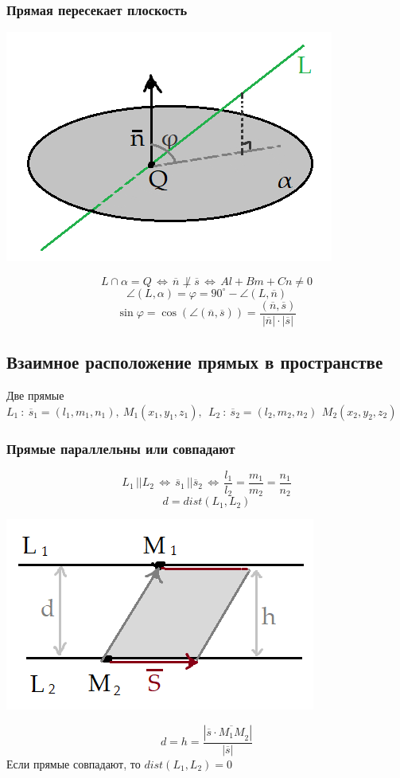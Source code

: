 \documentclass{article}
\begin{document}
\subsubsection{Прямая пересекает плоскость}
\begin{center}
    \includegraphics[scale=0.4]{pic9.png}
\end{center}
$$ L\cap\alpha=Q\,\Leftrightarrow\,\overline{n}\not\perp\overline{s}\,\Leftrightarrow\,Al+Bm+Cn\neq0 $$
$$ \angle(L,\alpha)=\varphi=90^{\circ} -\angle(L,\overline{n})$$
$$ \sin\varphi=\cos(\angle(\overline{n},\overline{s}))=\frac{(\overline{n},\overline{s})}{|\overline{n}|\cdot|\overline{s}|} $$
\subsection{Взаимное расположение прямых в пространстве}
Две прямые $L_1\::\:\overline{s}_1=(l_1,m_1,n_1),\:M_1(x_1,y_1,z_1),\:\:L_2\::\:\overline{s}_2=(l_2,m_2,n_2)\,\:M_2(x_2,y_2,z_2)$
\subsubsection{Прямые параллельны или совпадают}
$$ L_1\,||L_2\,\Leftrightarrow\,\overline{s}_1\,||\overline{s}_2\,\Leftrightarrow\,\frac{l_1}{l_2}=\frac{m_1}{m_2}=\frac{n_1}{n_2} $$
$$ d=dist(L_1,L_2) $$
\begin{center}
    \includegraphics[scale=0.4]{pic10.png}
\end{center}
$$ d=h=\frac{|\overline{s}\cdot\overline{M_1M}_2|}{|\overline{s}|} $$
Если прямые совпадают, то $dist(L_1,L_2)=0$
\end{document}

